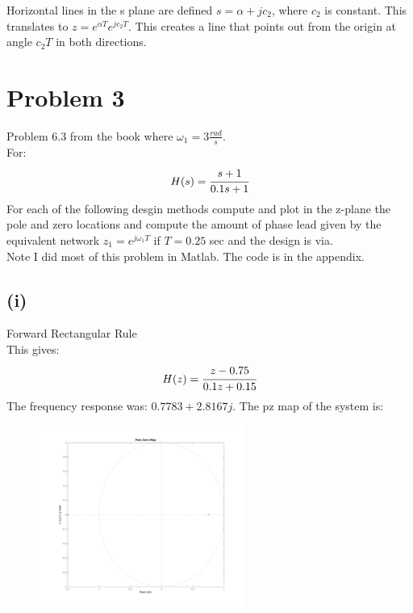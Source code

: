 \documentclass{article}
\begin{document}
Horizontal lines in the s plane are defined $s=\alpha+jc_2$, where $c_2$ is constant. This translates to $z=e^{\alpha T}e^{jc_2 T}$. This creates a line that points out from the origin at angle $c_2 T$ in both directions.

\section*{Problem 3}
Problem 6.3 from the book where $\omega_1=3\frac{rad}{s}$.\\
For:
\[H(s)=\cfrac{s+1}{0.1s+1}\]
For each of the following desgin methods compute and plot in the z-plane the pole and zero locations and compute the amount of phase lead given by the equivalent network $z_1=e^{j\omega_1T}$ if $T=0.25$ sec and the design is via.\\

Note I did most of this problem in Matlab. The code is in the appendix.
\subsection*{(i)}
Forward Rectangular Rule\\
This gives:
\[H(z)=\cfrac{z-0.75}{0.1z+0.15}\]
The frequency response was: $0.7783+2.8167j$. The pz map of the system is:
\begin{figure}[H]
    \centering
    \includegraphics[width=0.6\textwidth]{PR3_1.png}
\end{figure}
\end{document}
